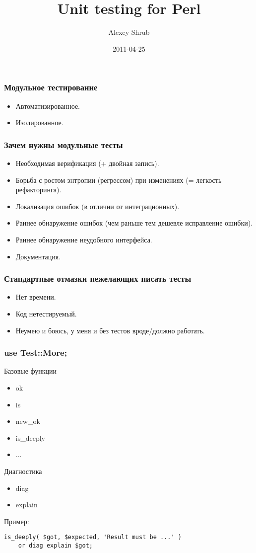 \documentclass{beamer}
\title{Unit testing for Perl}
\author{Alexey Shrub}
\institute{ashrub@yandex.ru}
\date{2011-04-25}
\begin{document}
\maketitle

\begin{frame}
\frametitle{Модульное тестирование}
\begin{itemize}
\item Автоматизированное.
\item Изолированное.
\end{itemize}
\end{frame}

\begin{frame}
\frametitle{Зачем нужны модульные тесты}
\begin{itemize}
\item Необходимая верификация (+ двойная запись).
\item Борьба с ростом энтропии (регрессом) при изменениях (= легкость рефакторинга).
\item Локализация ошибок (в отличии от интеграционных).
\item Раннее обнаружение ошибок (чем раньше тем дешевле исправление ошибки).
\item Раннее обнаружение неудобного интерфейса.
\item Документация.
\end{itemize}
\end{frame}

\begin{frame}
\frametitle{Стандартные отмазки нежелающих писать тесты}
\begin{itemize}
\item Нет времени.
\item Код нетестируемый.
\item Неумею и боюсь, у меня и без тестов вроде/должно работать.
\end{itemize}
\end{frame}

\begin{frame}[fragile]
\frametitle{use Test::More;}
Базовые функции
\begin{itemize}
\item ok
\item is
\item new\_ok
\item is\_deeply
\item ...
\end{itemize}
Диагностика
\begin{itemize}
\item diag
\item explain
\end{itemize}
Пример:
\begin{lstlisting}
is_deeply( $got, $expected, 'Result must be ...' )
    or diag explain $got;
\end{lstlisting}
\end{frame}
\end{document}
